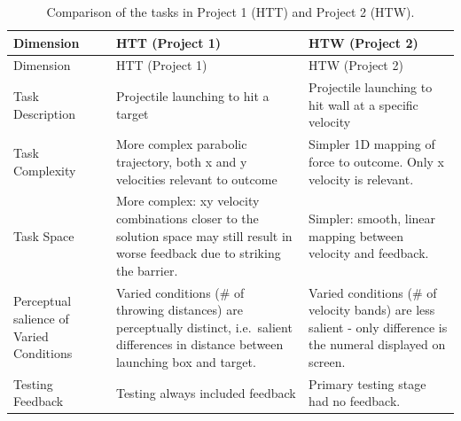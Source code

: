\documentclass[
  11pt,
  letterpaper,
]{article}
\begin{document}
\begin{longtable}[]{@{}
  >{\raggedright\arraybackslash}p{}
  >{\raggedright\arraybackslash}p{}
  >{\raggedright\arraybackslash}p{}@{}}
\caption{Comparison of the tasks in Project 1 (HTT) and Project 2
(HTW).}\label{tbl-task-diff}\tabularnewline
\toprule\noalign{}
\begin{minipage}[b]{\linewidth}\raggedright
Dimension
\end{minipage} & \begin{minipage}[b]{\linewidth}\raggedright
HTT (Project 1)
\end{minipage} & \begin{minipage}[b]{\linewidth}\raggedright
HTW (Project 2)
\end{minipage} \\
\midrule\noalign{}
\endfirsthead
\toprule\noalign{}
\begin{minipage}[b]{\linewidth}\raggedright
Dimension
\end{minipage} & \begin{minipage}[b]{\linewidth}\raggedright
HTT (Project 1)
\end{minipage} & \begin{minipage}[b]{\linewidth}\raggedright
HTW (Project 2)
\end{minipage} \\
\midrule\noalign{}
\endhead
\bottomrule\noalign{}
\endlastfoot
Task Description & Projectile launching to hit a target & Projectile
launching to hit wall at a specific velocity \\
Task Complexity & More complex parabolic trajectory, both x and y
velocities relevant to outcome & Simpler 1D mapping of force to outcome.
Only x velocity is relevant. \\
Task Space & More complex: xy velocity combinations closer to the
solution space may still result in worse feedback due to striking the
barrier. & Simpler: smooth, linear mapping between velocity and
feedback. \\
Perceptual salience of Varied Conditions & Varied conditions (\# of
throwing distances) are perceptually distinct, i.e.~salient differences
in distance between launching box and target. & Varied conditions (\# of
velocity bands) are less salient - only difference is the numeral
displayed on screen. \\
Testing Feedback & Testing always included feedback & Primary testing
stage had no feedback. \\

\end{longtable}
\end{document}
